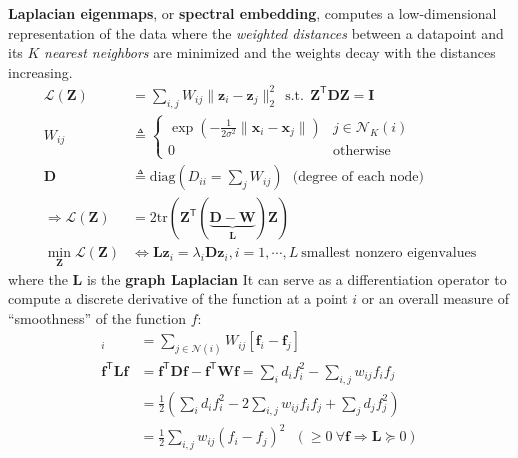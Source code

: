 \textbf{Laplacian eigenmaps}, or \textbf{spectral embedding}, computes a low-dimensional representation of the data 
where the \textit{weighted distances} between a datapoint and its $K$ \textit{nearest neighbors} are minimized
and the weights decay with the distances increasing.
\begin{align}
    \mathcal{L}(\mathbf{Z}) & = \sum_{i,j}W_{ij}\|\bm{z}_i-\bm{z}_j\|^2_2~~\mathrm{s.t.}~~\mathbf{Z}^\mathsf{T}\mathbf{DZ}=\mathbf{I} \\
    W_{ij} & \triangleq \begin{cases}
        \exp\left(-\frac{1}{2\sigma^2}\|\bm{x}_i-\bm{x}_j\|\right) & j\in\mathcal{N}_K(i) \\
        0 & \text{otherwise}
    \end{cases} \\
    \mathbf{D} & \triangleq \mathrm{diag}(D_{ii}=\sum_{j}W_{ij}) ~~~\text{(degree of each node)} \\
    \Rightarrow
    \mathcal{L}(\mathbf{Z}) & = 2\mathrm{tr}(\mathbf{Z}^\mathsf{T}(\underbrace{\mathbf{D}-\mathbf{W}}_{\mathbf{L}})\mathbf{Z}) \\
    \min_{\mathbf{Z}} \mathcal{L}(\mathbf{Z}) & \iff \mathbf{L}\bm{z}_i = \lambda_i\mathbf{D}\bm{z}_i,i=1,\cdots,L ~\text{smallest nonzero eigenvalues}
\end{align}
where the $\mathbf{L}$ is the \textbf{graph Laplacian}
It can serve as a differentiation operator to compute a discrete derivative of the function at a point $i$ or an overall measure of ``smoothness'' of the function $f$:
\begin{align}
    [\mathbf{L}\bm{f}]_i 
    & = \sum_{j\in\mathcal{N}(i)}W_{ij}[\bm{f}_i-\bm{f}_j] \\
    \bm{f}^\mathsf{T}\mathbf{L}\bm{f} 
    & = \bm{f}^\mathsf{T}\mathbf{D}\bm{f} - \bm{f}^\mathsf{T}\mathbf{W}\bm{f} 
    = \sum_{i}d_if_i^2 - \sum_{i,j}w_{ij}f_if_j \\
    & = \frac{1}{2}\left(\sum_i d_if_i^2 - 2\sum_{i,j}w_{ij}f_if_j + \sum_j d_jf_j^2\right) \\
    & = \frac{1}{2}\sum_{i,j}w_{ij}(f_i-f_j)^2~~~(\geq 0~\forall\bm{f}\Rightarrow \mathbf{L}\succeq 0)
\end{align}








